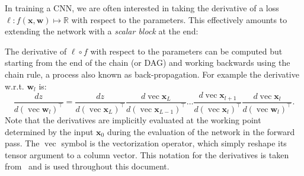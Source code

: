 \documentclass[12pt]{article}
\newcommand{\real}{\mathbb{R}}
\newcommand{\vv}{\operatorname{vec}}
\newcommand{\bx}{\mathbf{x}}
\newcommand{\bw}{\mathbf{w}}
\begin{document}
In training a CNN, we are often interested in taking the derivative of a loss $\ell : f(\bx,\bw) \mapsto \real$ with respect to the parameters. This effectively amounts to extending the network with a \emph{scalar block} at the end:
\begin{center}
\end{center}
The derivative of $\ell \circ f$ with respect to the parameters can be computed but starting from the end of the chain (or DAG) and working backwards using the chain rule, a process also known as back-propagation. For example the derivative w.r.t. $\bw_l$ is:
\begin{equation}\label{e:chain-rule}
 \frac{dz}{d(\vv\bw_l)^\top}
 =
 \frac{dz}{d(\vv\bx_{L})^\top}
 \frac{d\vv\bx_{L}}{d(\vv\bx_{L-1})^\top}
 \dots
 \frac{d\vv\bx_{l+1}}{d(\vv\bx_{l})^\top}
 \frac{d\vv\bx_{l}}{d(\vv\bw_{l})^\top}.
\end{equation}
Note that the derivatives are implicitly evaluated at the working point determined by the input $\bx_0$ during the evaluation of the network in the forward pass. The $\vv$ symbol is the vectorization operator, which simply reshape its tensor argument to a column vector. This notation for the derivatives is taken from~\cite{kinghorn96integrals} and is used throughout this document.
\end{document}
